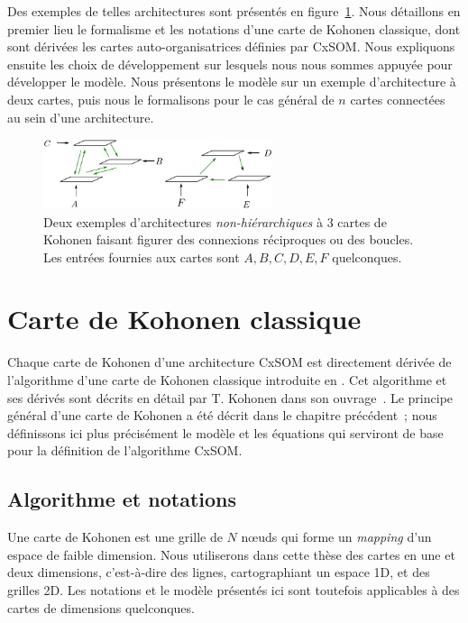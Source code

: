 \documentclass[../main]{subfiles}
\begin{document}
Des exemples de telles architectures sont présentés en figure~\ref{fig:archi_non_hierarchique}.
Nous détaillons en premier lieu le formalisme et les notations d'une carte de Kohonen classique, dont sont dérivées les cartes auto-organisatrices définies par CxSOM. 
Nous expliquons ensuite les choix de développement sur lesquels nous nous sommes appuyée pour développer le modèle. Nous présentons le modèle sur un exemple d'architecture à deux cartes, puis nous le formalisons pour le cas général de $n$ cartes connectées au sein d'une architecture.

\begin{figure}
\centering
\includegraphics[width=0.6\textwidth]{architecture.pdf}
\caption{Deux exemples d'architectures \emph{non-hiérarchiques} à 3 cartes de Kohonen faisant figurer des connexions réciproques ou des boucles.
Les entrées fournies aux cartes sont $A,B,C,D,E,F$ quelconques.}
\label{fig:archi_non_hierarchique}
\end{figure}


\section{Carte de Kohonen classique}\label{sec:kohonen}

Chaque carte de Kohonen d'une architecture CxSOM est directement dérivée de l'algorithme d'une carte de Kohonen classique introduite en \cite{Kohonen1982}. Cet algorithme et ses dérivés sont décrits en détail par T. Kohonen dans son ouvrage~\parencite{Kohonen1995SelfOrganizingM}. Le principe général d'une carte de Kohonen a été décrit dans le chapitre précédent~; nous définissons ici plus précisément le modèle et les équations qui serviront de base pour la définition de l'algorithme CxSOM.

\subsection{Algorithme et notations}

Une carte de Kohonen est une grille de $N$ n\oe{}uds qui forme un \emph{mapping} d'un espace de faible dimension. 
Nous utiliserons dans cette thèse des cartes en une et deux dimensions, c'est-à-dire des lignes, cartographiant un espace 1D, et des grilles 2D. Les notations et le modèle présentés ici sont toutefois applicables à des cartes de dimensions quelconques.
\end{document}
